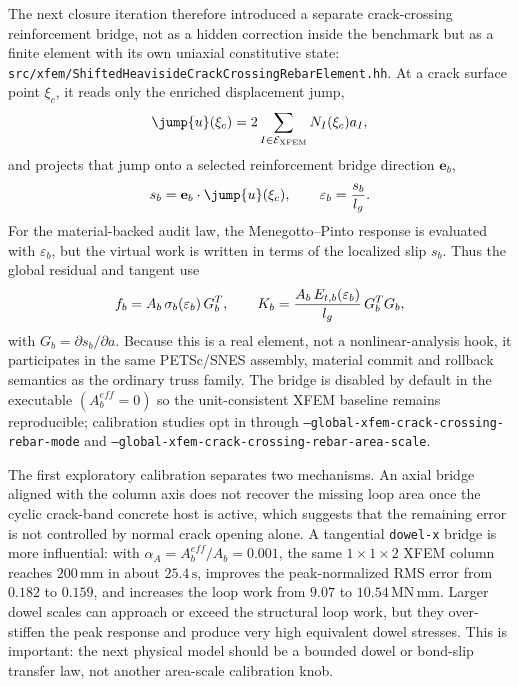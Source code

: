 The next closure iteration therefore introduced a separate crack-crossing
reinforcement bridge, not as a hidden correction inside the benchmark but as a
finite element with its own uniaxial constitutive state:
\texttt{src/xfem/ShiftedHeavisideCrackCrossingRebarElement.hh}.  At a crack
surface point \(\xi_c\), it reads only the enriched displacement jump,
\[
  \jump{u}(\xi_c)=
  2\sum_{I\in\mathcal{E}_{\mathrm{XFEM}}}N_I(\xi_c)a_I,
\]
and projects that jump onto a selected reinforcement bridge direction
\(\mathbf e_b\),
\[
  s_b = \mathbf e_b\cdot \jump{u}(\xi_c),\qquad
  \varepsilon_b ={s_b\over l_g}.
\]
For the material-backed audit law, the Menegotto--Pinto response is evaluated
with \(\varepsilon_b\), but the virtual work is written in terms of the
localized slip \(s_b\).  Thus the global residual and tangent use
\[
  f_b = A_b\,\sigma_b(\varepsilon_b)\,G_b^T,\qquad
  K_b = {A_b\,E_{t,b}(\varepsilon_b)\over l_g}\,G_b^T G_b,
\]
with \(G_b=\partial s_b/\partial a\).  Because this is a real
element, not a nonlinear-analysis hook, it participates in the same
PETSc/SNES assembly, material commit and rollback semantics as the ordinary
truss family.  The bridge is disabled by default in the executable
\((A_b^{eff}=0)\) so the unit-consistent XFEM baseline remains reproducible;
calibration studies opt in through
\texttt{--global-xfem-crack-crossing-rebar-mode} and
\texttt{--global-xfem-crack-crossing-rebar-area-scale}.

The first exploratory calibration separates two mechanisms.  An axial bridge
aligned with the column axis does not recover the missing loop area once the
cyclic crack-band concrete host is active, which suggests that the remaining
error is not controlled by normal crack opening alone.  A tangential
\texttt{dowel-x} bridge is more influential: with
\(\alpha_A=A_b^{eff}/A_b=0.001\), the same \(1\times1\times2\) XFEM column
reaches \(200\,\mathrm{mm}\) in about \(25.4\,\mathrm{s}\), improves the
peak-normalized RMS error from \(0.182\) to \(0.159\), and increases the loop
work from \(9.07\) to \(10.54\,\mathrm{MN\,mm}\).  Larger dowel scales can
approach or exceed the structural loop work, but they over-stiffen the peak
response and produce very high equivalent dowel stresses.  This is important:
the next physical model should be a bounded dowel or bond-slip transfer law,
not another area-scale calibration knob.

